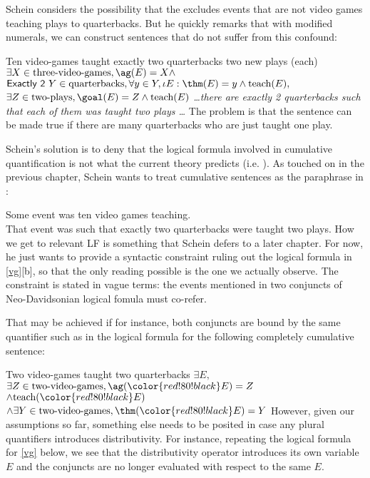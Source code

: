 Schein considers the possibility that the  excludes events that are not video games teaching plays to quarterbacks. But he quickly remarks that with modified numerals, we can construct sentences that do not suffer from this confound:

\pex \label{vg}
\a
Ten video-games taught exactly two quarterbacks two new plays (each)
\a
$\exists X\in \text{three-video-games}, \ag(E) = X \wedge $\\
$\textsf{Exactly 2 } Y\in \text{quarterbacks}, \forall y \in Y, \iota E: \thm(E) = y \wedge \text{teach}(E),$\\
$\exists Z\in \text{two-plays}, \goal(E) = Z \wedge \text{teach}(E)$
\a  
\emph{\ldots there are exactly 2 quarterbacks such that each of them was taught two plays \ldots}
\xe
%
The problem is that the sentence can be made true if there are many quarterbacks who are just taught one play.

Schein's solution is to deny that the logical formula involved in cumulative quantification is not what the current theory predicts (i.e. \clastxb). As touched on in the previous chapter, Schein wants to treat cumulative sentences as the paraphrase in \cnextx:

\ex
Some event was ten video games teaching.\\
That event was such that exactly two quarterbacks were taught two plays.
\xe
%
How we get to relevant LF is something that Schein defers to a later chapter. For now, he just wants to provide a syntactic constraint ruling out the logical formula in \cref{vg}[b], so that the only reading possible is the one we actually observe. The constraint is stated in vague terms: the events mentioned in two conjuncts of Neo-Davidsonian logical fomula must co-refer. 

That may be achieved if for instance, both conjuncts are bound by the same quantifier such as in the logical formula for the following completely cumulative sentence:

\pex
\a
Two video-games taught two quarterbacks
\a 
$\exists E,$\\
$\exists Z\in \text{two-video-games}, \ag({\color{red!80!black} E}) = Z$\\
$\wedge\text{teach}({\color{red!80!black} E})$\\
$\wedge\exists Y\in \text{two-video-games}, \thm({\color{red!80!black} E}) = Y$
\xe
%
However, given our assumptions so far, something else needs to be posited in case any plural quantifiers introduces distributivity. For instance, repeating the logical formula for \cref{vg} below, we see that the distributivity operator introduces its own variable $E$ and the conjuncts are no longer evaluated with respect to the same $E$.

